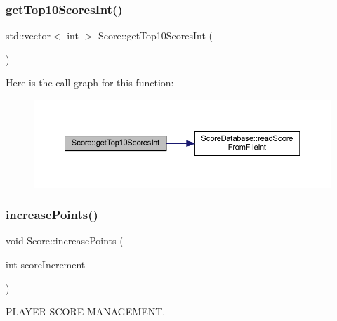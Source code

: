 \mbox{\label{class_score_a5f1d05dd49200b53b806751a6e9d6fbe}} 
\subsubsection{\texorpdfstring{get\+Top10\+Scores\+Int()}{getTop10ScoresInt()}}
{\footnotesize\ttfamily std\+::vector$<$ int $>$ Score\+::get\+Top10\+Scores\+Int (\begin{DoxyParamCaption}{ }\end{DoxyParamCaption})}

Here is the call graph for this function\+:
\nopagebreak
\begin{figure}[H]
\begin{center}
\leavevmode
\includegraphics[width=350pt]{class_score_a5f1d05dd49200b53b806751a6e9d6fbe_cgraph}
\end{center}
\end{figure}
\mbox{\label{class_score_a017f4ad80df1e9d51e62789d8e5e9605}} 
\subsubsection{\texorpdfstring{increase\+Points()}{increasePoints()}}
{\footnotesize\ttfamily void Score\+::increase\+Points (\begin{DoxyParamCaption}\item[{int}]{score\+Increment }\end{DoxyParamCaption})}



P\+L\+A\+Y\+ER S\+C\+O\+RE M\+A\+N\+A\+G\+E\+M\+E\+NT. 

